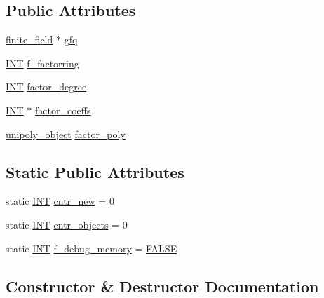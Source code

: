 \subsection*{Public Attributes}
\begin{DoxyCompactItemize}
\item 
\mbox{\hyperlink{classfinite__field}{finite\+\_\+field}} $\ast$ \mbox{\hyperlink{classunipoly__domain_a365f2b14c8163f46577c19660672f7d5}{gfq}}
\item 
\mbox{\hyperlink{galois_8h_a09fddde158a3a20bd2dcadb609de11dc}{I\+NT}} \mbox{\hyperlink{classunipoly__domain_a14c39e8f06d2fea88695fa64e609c4aa}{f\+\_\+factorring}}
\item 
\mbox{\hyperlink{galois_8h_a09fddde158a3a20bd2dcadb609de11dc}{I\+NT}} \mbox{\hyperlink{classunipoly__domain_a1bea74244e1e9b11b2f82597b6b129a7}{factor\+\_\+degree}}
\item 
\mbox{\hyperlink{galois_8h_a09fddde158a3a20bd2dcadb609de11dc}{I\+NT}} $\ast$ \mbox{\hyperlink{classunipoly__domain_a6ff1b4cc04efab8ac54d58031946b1b1}{factor\+\_\+coeffs}}
\item 
\mbox{\hyperlink{galois_8h_a77ca58de3d2da6172242493dd9c8aaa8}{unipoly\+\_\+object}} \mbox{\hyperlink{classunipoly__domain_a924d862d84dcfa24e4f51d375cba7a16}{factor\+\_\+poly}}
\end{DoxyCompactItemize}
\subsection*{Static Public Attributes}
\begin{DoxyCompactItemize}
\item 
static \mbox{\hyperlink{galois_8h_a09fddde158a3a20bd2dcadb609de11dc}{I\+NT}} \mbox{\hyperlink{classunipoly__domain_a815bba80e8aeb40ccfdd7a23f993007c}{cntr\+\_\+new}} = 0
\item 
static \mbox{\hyperlink{galois_8h_a09fddde158a3a20bd2dcadb609de11dc}{I\+NT}} \mbox{\hyperlink{classunipoly__domain_a76acfd929528696c0ec432df75f3e7ed}{cntr\+\_\+objects}} = 0
\item 
static \mbox{\hyperlink{galois_8h_a09fddde158a3a20bd2dcadb609de11dc}{I\+NT}} \mbox{\hyperlink{classunipoly__domain_a35ef806b05e4547a52901750c945783d}{f\+\_\+debug\+\_\+memory}} = \mbox{\hyperlink{nauty_8h_aa93f0eb578d23995850d61f7d61c55c1}{F\+A\+L\+SE}}
\end{DoxyCompactItemize}


\subsection{Constructor \& Destructor Documentation}
\mbox{\label{classunipoly__domain_af4d5e783d5f52d5475c4db64ef7d8071}} 
